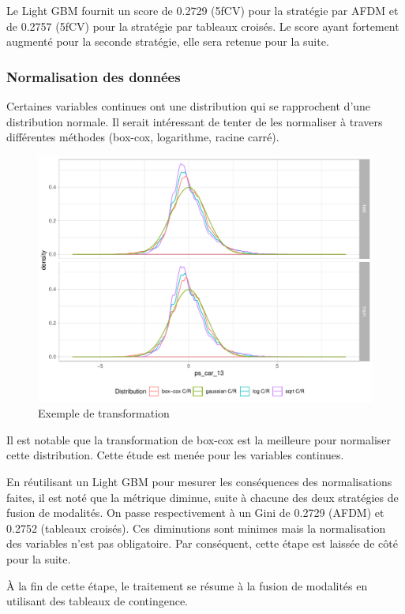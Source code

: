 \documentclass[french]{article}
\begin{document}
\begin{multicols}{2}
Le Light GBM fournit un score de 0.2729 (5fCV) pour la stratégie par AFDM et de 0.2757 (5fCV) pour la stratégie par tableaux croisés. Le score ayant fortement augmenté pour la seconde stratégie, elle sera retenue pour la suite.

\subsubsection{Normalisation des données}

Certaines variables continues ont une distribution qui se rapprochent d'une distribution normale. Il serait intéressant de tenter de les normaliser à travers différentes méthodes (box-cox, logarithme, racine carré).

\begin{figure}[H] \centering
  \includegraphics[width = \columnwidth]{img/ex_normalisation}
  \caption{Exemple de transformation}
\end{figure}

Il est notable que la transformation de box-cox est la meilleure pour normaliser cette distribution. Cette étude est menée pour les variables continues.

En réutilisant un Light GBM pour mesurer les conséquences des normalisations faites, il est noté que la métrique diminue, suite à chacune des deux stratégies de fusion de modalités. On passe respectivement à un Gini de 0.2729 (AFDM) et 0.2752 (tableaux croisés). Ces diminutions sont minimes mais la normalisation des variables n'est pas obligatoire. Par conséquent, cette étape est laissée de côté pour la suite. 

À la fin de cette étape, le traitement se résume à la fusion de modalités en utilisant des tableaux de contingence.


\end{multicols}
\end{document}
